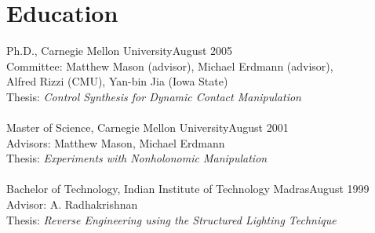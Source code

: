 \documentclass[10pt]{article}
\begin{document}
\section{Education}
\noindent
Ph.D., Carnegie Mellon University\hfill August 2005\\
Committee: Matthew Mason (advisor), Michael Erdmann (advisor),\\ 
Alfred Rizzi (CMU), Yan-bin Jia (Iowa State)\\
Thesis:  \textit{Control Synthesis for Dynamic Contact Manipulation}\\
\\
Master of Science, Carnegie Mellon University\hfill August 2001\\
Advisors: Matthew Mason, Michael Erdmann\\
Thesis:  \textit{Experiments with Nonholonomic Manipulation}\\
\\
Bachelor of Technology, Indian Institute of Technology Madras\hfill August 1999\\
Advisor: A. Radhakrishnan\\
Thesis: \textit{Reverse Engineering using the Structured Lighting Technique}
\end{document}
